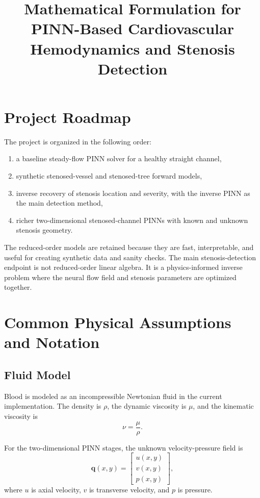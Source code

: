 \documentclass[11pt]{article}
\title{Mathematical Formulation for PINN-Based Cardiovascular Hemodynamics and Stenosis Detection}
\author{}
\date{}
\begin{document}
\maketitle

\section{Project Roadmap}

The project is organized in the following order:
\begin{enumerate}
    \item a baseline steady-flow PINN solver for a healthy straight channel,
    \item synthetic stenosed-vessel and stenosed-tree forward models,
    \item inverse recovery of stenosis location and severity, with the inverse PINN as the main detection method,
    \item richer two-dimensional stenosed-channel PINNs with known and unknown stenosis geometry.
\end{enumerate}

The reduced-order models are retained because they are fast, interpretable, and useful for creating synthetic data and sanity checks. The main stenosis-detection endpoint is not reduced-order linear algebra. It is a physics-informed inverse problem where the neural flow field and stenosis parameters are optimized together.

\section{Common Physical Assumptions and Notation}

\subsection{Fluid Model}

Blood is modeled as an incompressible Newtonian fluid in the current implementation. The density is $\rho$, the dynamic viscosity is $\mu$, and the kinematic viscosity is
\begin{equation}
    \nu = \frac{\mu}{\rho}.
\end{equation}

For the two-dimensional PINN stages, the unknown velocity-pressure field is
\begin{equation}
    \bm{q}(x,y)
    =
    \begin{bmatrix}
        u(x,y)\\
        v(x,y)\\
        p(x,y)
    \end{bmatrix},
\end{equation}
where $u$ is axial velocity, $v$ is transverse velocity, and $p$ is pressure.
\end{document}
